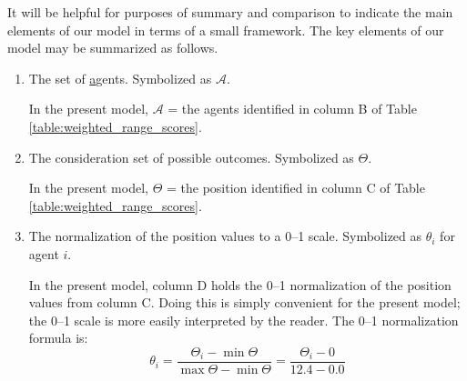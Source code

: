 It will be helpful for purposes of summary and comparison to indicate the main elements of our model in terms of a small framework.
The key elements of our model may be summarized as follows.
\begin{enumerate}
  \renewcommand{\theenumi}{\roman{enumi}}

\item The set of \underline{a}gents. Symbolized as $\mathcal{A}$.

 
 In the present model, $\mathcal{A}$ = the agents identified in column B of Table \ref{table:weighted_range_scores}. %
%
\item The consideration set of possible outcomes. Symbolized as $\Theta$.




In the present model, $\Theta$ = the   {position} identified in column C of Table \ref{table:weighted_range_scores}. %

\item The normalization of the   {position} values to a 0--1 scale. Symbolized as $\theta_i$ for agent $i$.


In the present model, column D holds the 0--1 normalization of the   {position} values from column C.  Doing this is simply convenient for the present model; the 0--1 scale is more easily interpreted by the reader. The 0--1 normalization formula is:
\begin{equation}
\theta_i = \frac{\Theta_i - \min\Theta}{\max{\Theta}-\min{\Theta}} = \frac{\Theta_i - 0}{12.4 - 0.0} 
\end{equation}


\end{enumerate}
